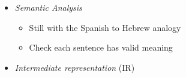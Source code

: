 {\begin{itemize}
\begin{itemize}
\begin{itemize}
\end{itemize}

\item \textit{Semantic Analysis}

\begin{itemize}

\item Still with the Spanish to Hebrew analogy
\item Check each sentence has valid meaning

\end{itemize}

\item \textit{Intermediate representation} (IR)

\end{itemize}

\end{itemize}

}